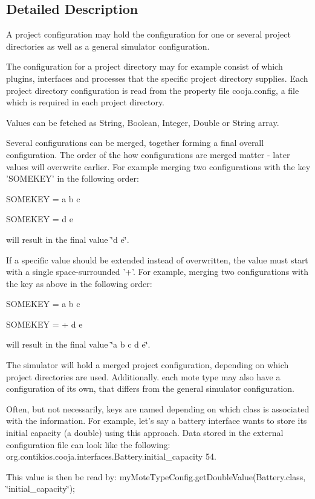 \subsection{Detailed Description}
A project configuration may hold the configuration for one or several project directories as well as a general simulator configuration.

The configuration for a project directory may for example consist of which plugins, interfaces and processes that the specific project directory supplies. Each project directory configuration is read from the property file cooja.\-config, a file which is required in each project directory.

Values can be fetched as String, Boolean, Integer, Double or String array.

Several configurations can be merged, together forming a final overall configuration. The order of the how configurations are merged matter -\/ later values will overwrite earlier. For example merging two configurations with the key 'S\-O\-M\-E\-K\-E\-Y' in the following order\-:

S\-O\-M\-E\-K\-E\-Y = a b c

S\-O\-M\-E\-K\-E\-Y = d e

will result in the final value \char`\"{}d e\char`\"{}.

If a specific value should be extended instead of overwritten, the value must start with a single space-\/surrounded '+'. For example, merging two configurations with the key as above in the following order\-:

S\-O\-M\-E\-K\-E\-Y = a b c

S\-O\-M\-E\-K\-E\-Y = + d e

will result in the final value \char`\"{}a b c d e\char`\"{}.

The simulator will hold a merged project configuration, depending on which project directories are used. Additionally. each mote type may also have a configuration of its own, that differs from the general simulator configuration.

Often, but not necessarily, keys are named depending on which class is associated with the information. For example, let's say a battery interface wants to store its initial capacity (a double) using this approach. Data stored in the external configuration file can look like the following\-: org.\-contikios.\-cooja.\-interfaces.\-Battery.\-initial\-\_\-capacity 54.

This value is then be read by\-: my\-Mote\-Type\-Config.\-get\-Double\-Value(Battery.\-class, \char`\"{}initial\-\_\-capacity\char`\"{});

